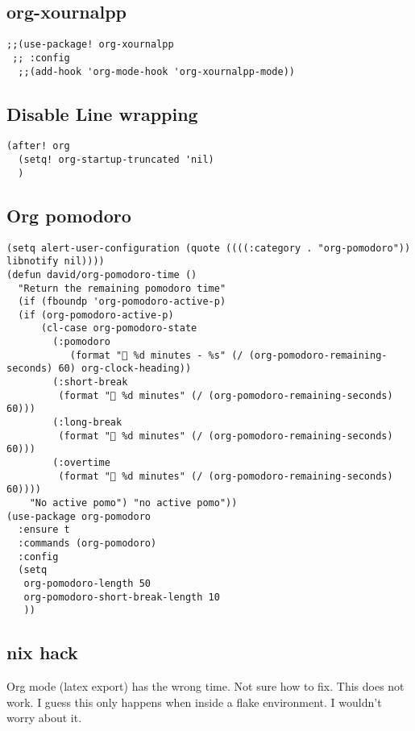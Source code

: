 \documentclass{assignments}
\begin{document}
\subsection*{org-xournalpp}
\label{sec:orgf126b40}
\begin{verbatim}
;;(use-package! org-xournalpp
 ;; :config
  ;;(add-hook 'org-mode-hook 'org-xournalpp-mode))

\end{verbatim}
\subsection*{Disable Line wrapping}
\label{sec:org606c8a4}
\begin{verbatim}
(after! org
  (setq! org-startup-truncated 'nil)
  )
\end{verbatim}
\subsection*{Org pomodoro}
\label{sec:org8ff1392}
\begin{verbatim}
(setq alert-user-configuration (quote ((((:category . "org-pomodoro")) libnotify nil))))
(defun david/org-pomodoro-time ()
  "Return the remaining pomodoro time"
  (if (fboundp 'org-pomodoro-active-p)
  (if (org-pomodoro-active-p)
      (cl-case org-pomodoro-state
        (:pomodoro
           (format "󰥔 %d minutes - %s" (/ (org-pomodoro-remaining-seconds) 60) org-clock-heading))
        (:short-break
         (format "󰾩 %d minutes" (/ (org-pomodoro-remaining-seconds) 60)))
        (:long-break
         (format "󰾩 %d minutes" (/ (org-pomodoro-remaining-seconds) 60)))
        (:overtime
         (format "󰗎 %d minutes" (/ (org-pomodoro-remaining-seconds) 60))))
    "No active pomo") "no active pomo"))
(use-package org-pomodoro
  :ensure t
  :commands (org-pomodoro)
  :config
  (setq
   org-pomodoro-length 50
   org-pomodoro-short-break-length 10
   ))
\end{verbatim}

\subsection*{nix hack}
\label{sec:org53a8475}
Org mode (latex export) has the wrong time. Not sure how to fix. This does not
work. I guess this only happens when inside a flake environment. I wouldn't
worry about it.
\end{document}
